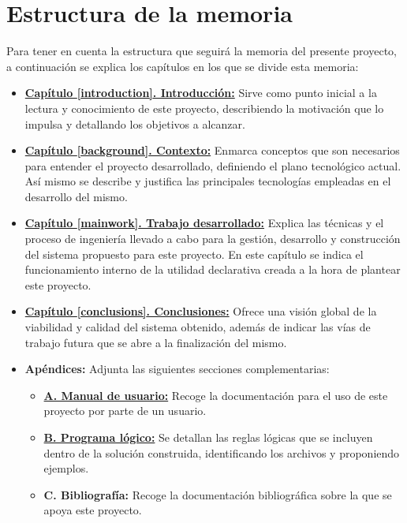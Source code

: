\section{Estructura de la memoria}

Para tener en cuenta la estructura que seguirá la memoria del presente proyecto, a continuación se explica los capítulos en los que se divide esta memoria:

\begin{itemize}
	\item \textbf{\hyperlink{introduccion}{Capítulo \ref*{introduction}. Introducción:}} Sirve como punto inicial a la lectura y conocimiento de este proyecto, describiendo la motivación que lo impulsa y detallando los objetivos a alcanzar.
	\item \textbf{\hyperlink{background}{Capítulo \ref*{background}. Contexto:}} Enmarca conceptos que son necesarios para entender el proyecto desarrollado, definiendo el plano tecnológico actual. Así mismo se describe y justifica las principales tecnologías empleadas en el desarrollo del mismo.
	\item \textbf{\hyperlink{mainwork}{Capítulo \ref*{mainwork}. Trabajo desarrollado:}} Explica las técnicas y el proceso de ingeniería llevado a cabo para la gestión, desarrollo y construcción del sistema propuesto para este proyecto. En este capítulo se indica el funcionamiento interno de la utilidad declarativa creada a la hora de plantear este proyecto.
	\item \textbf{\hyperlink{conclusions}{Capítulo \ref*{conclusions}. Conclusiones:}} Ofrece una visión global de la viabilidad y calidad del sistema obtenido, además de indicar las vías de trabajo futura que se abre a la finalización del mismo.
	\item \textbf{Apéndices:} Adjunta las siguientes secciones complementarias:
	\begin{itemize}
		\item \textbf{\hyperlink{manual}{A. Manual de usuario:}} Recoge la documentación para el uso de este proyecto por parte de un usuario.
		\item \textbf{\hyperlink{asp}{B. Programa lógico:}} Se detallan las reglas lógicas que se incluyen dentro de la solución construida, identificando los archivos y proponiendo ejemplos.
		\item \textbf{C. Bibliografía:} Recoge la documentación bibliográfica sobre la que se apoya este proyecto.
	\end{itemize}
\end{itemize}

